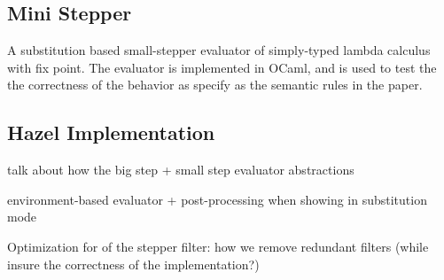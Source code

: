 \subsection{Mini Stepper}

A substitution based small-stepper evaluator of simply-typed lambda calculus with
fix point. The evaluator is implemented in OCaml, and is used to test the the
correctness of the behavior as specify as the semantic rules in the paper.

\subsection{Hazel Implementation}

talk about how the big step + small step evaluator abstractions

environment-based evaluator + post-processing when showing in substitution mode

Optimization for of the stepper filter: how we remove redundant filters (while
insure the correctness of the implementation?)
